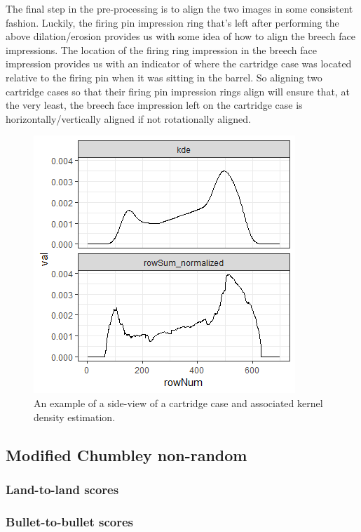 \documentclass[]{book}
\begin{document}
The final step in the pre-processing is to align the two images in some consistent fashion. Luckily, the firing pin impression ring that's left after performing the above dilation/erosion provides us with some idea of how to align the breech face impressions. The location of the firing ring impression in the breech face impression provides us with an indicator of where the cartridge case was located relative to the firing pin when it was sitting in the barrel. So aligning two cartridge cases so that their firing pin impression rings align will ensure that, at the very least, the breech face impression left on the cartridge case is horizontally/vertically aligned if not rotationally aligned.

\begin{figure}

{\centering \includegraphics[width=0.5\linewidth]{images/cartridge_cases/rowSum_kdeComparison} 

}

\caption{An example of a side-view of a cartridge case and associated kernel density estimation.}\label{fig:unnamed-chunk-23}
\end{figure}

\hypertarget{modified-chumbley-non-random}{%
\subsection{Modified Chumbley non-random}\label{modified-chumbley-non-random}}

\hypertarget{land-to-land-scores}{%
\subsubsection{Land-to-land scores}\label{land-to-land-scores}}

\hypertarget{bullet-to-bullet-scores}{%
\subsubsection{Bullet-to-bullet scores}\label{bullet-to-bullet-scores}}
\end{document}
